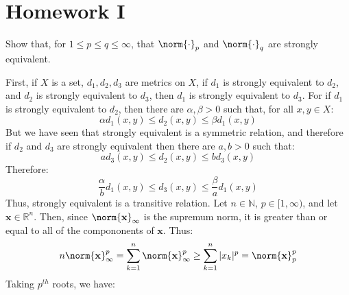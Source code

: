    \section{Homework I}
        \begin{problem}
            Show that, for $1\leq{p}\leq{q}\leq\infty$, that
            $\norm{\cdot}_{p}$ and $\norm{\cdot}_{q}$ are strongly
            equivalent.
        \end{problem}
        \begin{solution}[1]
            First, if $X$ is a set, $d_{1},d_{2},d_{3}$ are
            metrics on $X$, if $d_{1}$ is strongly equivalent to
            $d_{2}$, and $d_{2}$ is strongly equivalent to $d_{3}$,
            then $d_{1}$ is strongly equivalent to $d_{3}$.
            For if $d_{1}$ is strongly equivalent to $d_{2}$, then
            there are $\alpha,\beta>0$ such that, for all
            $x,y\in{X}$:
            \begin{equation}
                \alpha{d}_{1}(x,y)\leq{d}_{2}(x,y)
                \leq\beta{d}_{1}(x,y)
            \end{equation}
            But we have seen that strongly equivalent is a symmetric
            relation, and therefore if $d_{2}$ and $d_{3}$ are
            strongly equivalent then there are $a,b>0$ such that:
            \begin{equation}
                ad_{3}(x,y)\leq{d}_{2}(x,y)\leq{b}d_{3}(x,y)
            \end{equation}
            Therefore:
            \begin{equation}
                \frac{\alpha}{b}d_{1}(x,y)\leq{d}_{3}(x,y)
                \leq\frac{\beta}{a}d_{1}(x,y)
            \end{equation}
            Thus, strongly equivalent is a transitive relation.
            Let $n\in\mathbb{N}$, $p\in[1,\infty)$, and let
            $\mathbf{x}\in\mathbb{R}^{n}$. Then, since
            $\norm{\mathbf{x}}_{\infty}$ is the supremum norm,
            it is greater than or equal to all of the compononents
            of $\mathbf{x}$. Thus:
            \begin{equation}
                n\norm{\mathbf{x}}_{\infty}^{p}=
                \sum_{k=1}^{n}\norm{\mathbf{x}}_{\infty}^{p}
                \geq\sum_{k=1}^{n}|x_{k}|^{p}
                =\norm{\mathbf{x}}_{p}^{p}
            \end{equation}
            Taking $p^{th}$ roots, we have:
            \begin{equation}

\end{equation}
\end{solution}
